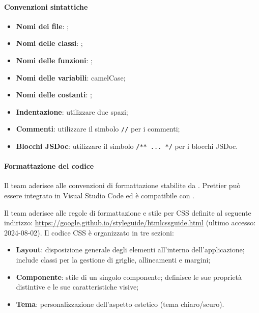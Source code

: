 \paragraph*{Convenzioni sintattiche}
\begin{itemize}
  \item \textbf{Nomi dei file}: ;
  \item \textbf{Nomi delle classi}: ;
  \item \textbf{Nomi delle funzioni}: ;
  \item \textbf{Nomi delle variabili}: camelCase;
  \item \textbf{Nomi delle costanti}: ;
  \item \textbf{Indentazione}: utilizzare due spazi;
  \item \textbf{Commenti}: utilizzare il simbolo \verb|//| per i commenti;
  \item \textbf{Blocchi JSDoc}: utilizzare il simbolo \verb|/** ... */| per i blocchi JSDoc.
\end{itemize}

\paragraph*{Formattazione del codice}
\par Il team aderisce alle convenzioni di formattazione stabilite da . Prettier può essere integrato in Visual Studio Code ed è compatibile con .

\par Il team aderisce alle regole di formattazione e stile per CSS definite al seguente indirizzo: \href{https://google.github.io/styleguide/htmlcssguide.html}{https://google.github.io/styleguide/htmlcssguide.html} (ultimo accesso: 2024-08-02). Il codice CSS è organizzato in tre sezioni:
\begin{itemize}
  \item \textbf{Layout}: disposizione generale degli elementi all'interno dell'applicazione; include classi per la gestione di griglie, allineamenti e margini;
  \item \textbf{Componente}: stile di un singolo componente; definisce le sue proprietà distintive e le sue caratteristiche visive;
  \item \textbf{Tema}: personalizzazione dell'aspetto estetico (tema chiaro/scuro).
\end{itemize}

